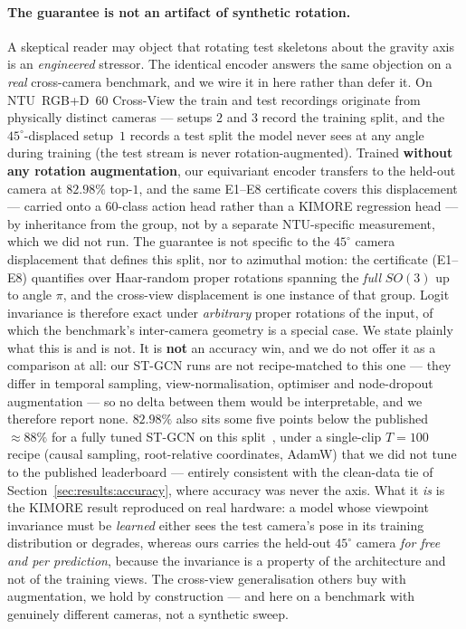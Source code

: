 \paragraph{The guarantee is not an artifact of synthetic rotation.} A skeptical reader may object
that rotating test skeletons about the gravity axis is an \emph{engineered} stressor. The
identical encoder answers the same objection on a \emph{real} cross-camera benchmark, and we wire it
in here rather than defer it. On NTU~RGB+D~$60$ Cross-View the train and test recordings originate
from physically distinct cameras --- setups $2$ and $3$ record the training split, and the
$45^\circ$-displaced setup~$1$ records a test split the model never sees at any angle during
training (the test stream is never rotation-augmented). Trained \textbf{without any rotation
augmentation}, our equivariant encoder transfers to the held-out camera at $82.98\%$ top-$1$, and the
same E1--E8 certificate covers this displacement --- carried onto a $60$-class action head rather than
a KIMORE regression head --- by inheritance from the group, not by a separate NTU-specific
measurement, which we did not run. The guarantee is not specific to
the $45^\circ$ camera displacement that defines this split, nor to azimuthal motion: the certificate
(E1--E8) quantifies over Haar-random proper rotations spanning the \emph{full} $SO(3)$ up to angle
$\pi$, and the cross-view displacement is one instance of that group. Logit invariance is therefore
exact under \emph{arbitrary} proper rotations of the input, of which the benchmark's inter-camera
geometry is a special case. We state plainly what this is and
is not. It is \textbf{not} an accuracy win, and we do not offer it as a comparison at all: our ST-GCN
runs are not recipe-matched to this one --- they differ in temporal sampling, view-normalisation,
optimiser and node-dropout augmentation --- so no delta between them would be interpretable, and we
therefore report none. $82.98\%$ also sits some five points below the published $\approx\!88\%$ for a
fully tuned ST-GCN on this split~\cite{yan2018stgcn}, under a single-clip $T{=}100$ recipe (causal
sampling, root-relative coordinates, AdamW) that we did not tune to the published leaderboard ---
entirely consistent with the clean-data tie of Section~\ref{sec:results:accuracy}, where accuracy was
never the axis. What it \emph{is} is the KIMORE result reproduced on real hardware: a model whose viewpoint
invariance must be \emph{learned} either sees the test camera's pose in its training distribution or
degrades, whereas ours carries the held-out $45^\circ$ camera \emph{for free and per prediction},
because the invariance is a property of the architecture and not of the training views. The
cross-view generalisation others buy with augmentation, we hold by construction --- and here on a
benchmark with genuinely different cameras, not a synthetic sweep.


